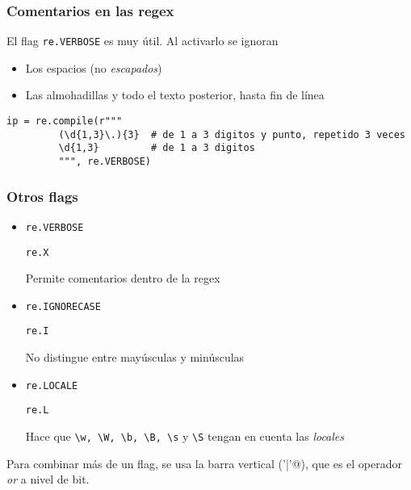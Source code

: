 \documentclass[ucs]{beamer}
\begin{document}


\begin{frame}[fragile]
\frametitle{Comentarios en las regex}
El flag \verb|re.VERBOSE| es muy útil. Al activarlo se ignoran
\begin{itemize}
\item
Los espacios (no \emph{escapados}) 
\item
Las almohadillas y todo el texto posterior, hasta fin de línea
\end{itemize}

  \begin{footnotesize}
  \begin{verbatim}
ip = re.compile(r"""
         (\d{1,3}\.){3}  # de 1 a 3 digitos y punto, repetido 3 veces
         \d{1,3}         # de 1 a 3 digitos 
         """, re.VERBOSE)
  \end{verbatim}
  \end{footnotesize}


\end{frame}


\begin{frame}[fragile]
\frametitle{Otros flags}
\begin{itemize}
\item
\verb|re.VERBOSE|

\verb|re.X|

Permite comentarios dentro de la regex


\item
\verb|re.IGNORECASE|

\verb|re.I|

No distingue entre mayúsculas y minúsculas
\item
\verb|re.LOCALE|

\verb|re.L|

Hace que  \verb|\w, \W, \b, \B, \s| y \verb|\S|
tengan en cuenta las \emph{locales}
\end{itemize}

Para combinar más de un flag, se usa la barra vertical
(\verb@'|'@), que es el operador
\emph{or} a nivel de bit.

\end{frame}
\end{document}
